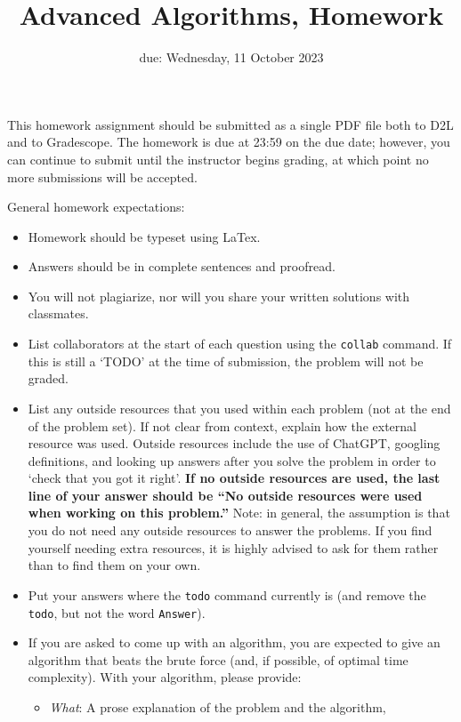 \documentclass{article}
\title{Advanced Algorithms, Homework \hwnum}
\author{\todo{Your Name Here}}
\date{due: Wednesday, 11 October 2023}
\begin{document}
\maketitle

This homework assignment should be
submitted as a single PDF file both to D2L and to Gradescope.  The homework is
due at 23:59 on the due date; however, you can continue to submit until the
instructor begins grading, at which point no more submissions will be accepted.

General homework expectations:
\begin{itemize}
    \item Homework should be typeset using LaTex.
    \item Answers should be in complete sentences and proofread.
    \item You will not plagiarize, nor will you share your written solutions
        with classmates.
    \item List collaborators at the start of each question using the
        \texttt{collab} command. If this is still a `TODO' at the time of
        submission, the problem will not
        be graded.
    \item List any outside resources that you used within each problem (not at
        the end of the problem set). If not clear from context, explain how the
        external resource was used.  Outside resources include the use of
        ChatGPT, googling definitions, and looking up answers after you solve
        the problem in order to `check that you got it right'.  {\bf If no outside resources are
        used, the last line of your answer should be ``No outside resources were
        used when working on this problem.''}  Note: in general, the assumption
        is that you do not need any outside resources to answer the problems.
        If you find yourself needing extra resources, it is highly advised to
        ask for them rather than to find them on your own.
    \item Put your answers where the \texttt{todo} command currently is (and
        remove the \texttt{todo}, but not the word \texttt{Answer}).
    \item If you are asked to come up with an algorithm, you are
        expected to give an algorithm that beats the brute force (and, if possible, of
        optimal time complexity). With your algorithm, please provide:
        \begin{itemize}
            \item \emph{What}: A prose explanation of the problem and the algorithm,

\end{itemize}
\end{itemize}
\end{document}
